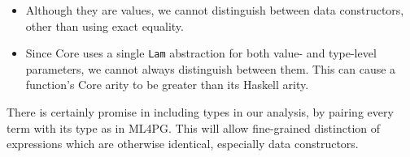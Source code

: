 \begin{itemize}
  \item Although they are values, we cannot distinguish between data constructors, other than using exact equality.
  \item Since Core uses a single \texttt{Lam} abstraction for both value- and type-level parameters, we cannot always distinguish between them. This can cause a function's Core arity to be greater than its Haskell arity.
\end{itemize}

There is certainly promise in including types in our analysis, by pairing every term with its type as in ML4PG. This will allow fine-grained distinction of expressions which are otherwise identical, especially data constructors.
